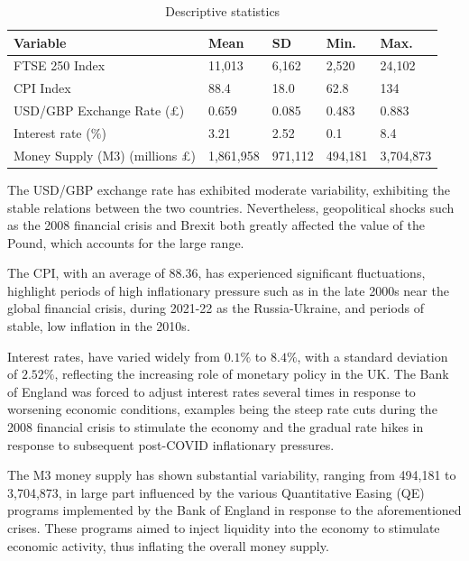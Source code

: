 \documentclass[11pt,a4paper]{article}
\begin{document}
\begin{table}[h!]
    \centering
    \caption{Descriptive statistics}
    \begin{tabular}{lllll}
        \toprule
        \textbf{Variable} & \textbf{Mean} & \textbf{SD} &  \textbf{Min.} & \textbf{Max.}\\
        \midrule
        FTSE 250 Index &  11,013 & 6,162 & 2,520 & 24,102 \\
        CPI Index &  88.4 & 18.0 & 62.8 & 134 \\
        USD/GBP Exchange Rate (£) &  0.659 & 0.085 & 0.483 & 0.883 \\
        Interest rate ($\%$) &  3.21 & 2.52 & 0.1 & 8.4 \\
        Money Supply (M3) (millions £) &  1,861,958 & 971,112 & 494,181 & 3,704,873 \\
        \bottomrule
    \end{tabular}
\end{table}


The USD/GBP exchange rate has exhibited moderate variability, exhibiting the stable relations between 
the two countries. Nevertheless, geopolitical shocks such as the 2008 financial crisis and Brexit both greatly affected the value of the Pound, 
which accounts for the large range. 

The CPI, with an average of 88.36, has 
experienced significant fluctuations, highlight periods of high inflationary pressure such as in the late 2000s 
near the global financial crisis, during 2021-22 as the Russia-Ukraine, and periods of stable, low
inflation in the 2010s.

Interest rates, have varied widely from $0.1\%$ to $8.4\%$, with a standard deviation of $2.52\%$, reflecting the 
increasing role of monetary policy in the UK. The Bank of England was forced to adjust interest rates 
several times in response to worsening economic conditions, examples being the steep rate cuts during the 2008 financial crisis to stimulate the economy and the gradual rate hikes in response to 
subsequent post-COVID inflationary pressures. 

The M3 money supply has shown substantial variability, ranging from 494,181 to 3,704,873, 
in large part influenced by the various Quantitative Easing (QE) programs implemented by the Bank of England 
in response to the aforementioned crises. These programs aimed to inject liquidity into the economy to stimulate economic activity, thus inflating the overall money supply.
\end{document}
